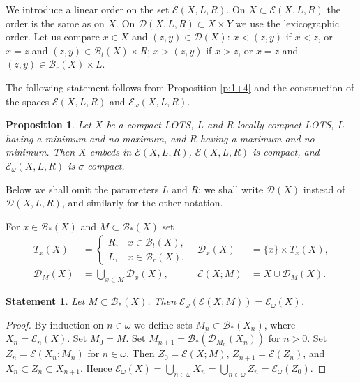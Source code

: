 \documentclass[preprint]{elsarticle}
\def\om{\omega}
\def\cB{\mathcal{B}}
\def\cE{\mathcal{E}}
\def\sset#1{\{#1\}}
\def\cB{{\mathcal B}}
\def\cB{{\mathcal B}}
\def\cD{{\mathcal D}}
\newtheorem{statement}{Statement}[section]
\newtheorem{proposition}{Proposition}[section]
\theoremstyle{definition}
\theoremstyle{remark}
\def\nom{{n\in\om}}
\def\er{\cB_r}
\def\el{\cB_l}
\def\ea{\cB_*}
\def\ex{\cE}
\begin{document}
We introduce a linear order on the set $\ex(X,L,R)$. On $X\subset \ex(X,L,R)$ the order is the same as on $X$. On $\cD(X,L,R)\subset X\times Y$ we use the lexicographic order. Let us compare $x\in X$ and $(z,y)\in \cD(X)$: $x<(z,y)$ if $x<z$, or $x=z$ and $(z,y)\in \el(X)\times R$; $x>(z,y)$ if $x>z$, or $x=z$ and $(z,y)\in \er(X)\times L$.



The following statement follows from Proposition \ref{p:1+4} and the construction of the spaces $\ex(X,L,R)$ and $\ex_\om(X,L,R)$.

\begin{proposition}\label{p:exos:1}
Let $X$ be a compact LOTS, $L$ and $R$ locally compact LOTS, $L$ having a minimum and no maximum, and $R$ having a maximum and no minimum. Then $X$ embeds in $\ex(X,L,R)$, $\ex(X,L,R)$ is compact, and $\ex_\om(X,L,R)$ is $\sigma$-compact.
\end{proposition}

Below we shall omit the parameters $L$ and $R$: we shall write $\cD(X)$ instead of $\cD(X,L,R)$, and similarly for the other notation.


For $x\in \ea(X)$ and $M\subset \ea(X)$ set
\begin{align*}
T_{x}(X) &= \begin{cases}
 R,& x\in \el(X),
\\
 L,& x\in \er(X),
\end{cases}
&
\cD_{x}(X) &= \sset x \times T_x(X),
\\
\cD_{M}(X) &= \bigcup_{x\in M} \cD_{x}(X),
&
\ex(X;M) &= X \cup \cD_{M}(X).
\end{align*}


\begin{statement}\label{s:exos:1}
Let $M\subset \ea(X)$.
Then $\ex_\om(\ex(X;M))=\ex_\om(X)$.
\end{statement}
\begin{proof}
By induction on $n\in\om$ we define sets $M_n\subset \ea(X_n)$, where $X_n=\ex_n(X)$.
Set $M_0=M$. Set $M_{n+1}=\ea(\cD_{M_n}(X_n))$ for $n>0$. Set $Z_n=\ex(X_n;M_n)$ for $\nom$. Then $Z_0=\ex(X;M)$, $Z_{n+1}=\ex(Z_n)$, and $X_n\subset Z_n\subset X_{n+1}$. Hence $\ex_\om(X)=\bigcup_\nom X_n=\bigcup_\nom Z_n=\ex_\om(Z_0)$.
\end{proof}
\end{document}
